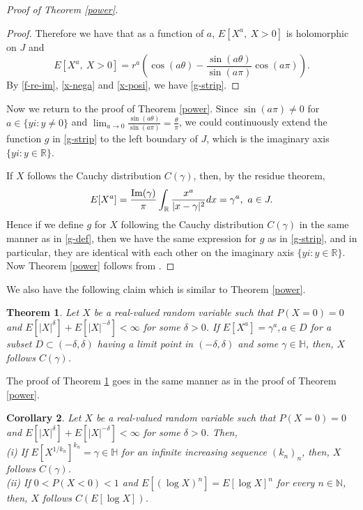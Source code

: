 \documentclass[a4paper, reqno, 11pt]{amsart}
\newtheorem{Thm}{Theorem}[section]
\newtheorem{Cor}[Thm]{Corollary}
\theoremstyle{definition}
\begin{document}
\begin{proof}[Proof of Theorem \ref{power}]
\begin{proof}
Therefore we have that as a function of $a$, 
$E\left[X^a, \ X > 0 \right]$ is holomorphic on $J$ and
\begin{equation}\label{x-posi} 
E\left[X^a, \ X > 0 \right] = r^a \left(\cos(a\theta) - \frac{\sin(a\theta)}{\sin(a\pi)}\cos(a\pi) \right). 
\end{equation}
By \eqref{f-re-im}, \eqref{x-nega} and \eqref{x-posi}, 
we have \eqref{g-strip}. 
\end{proof} 


Now we return to the proof of Theorem \ref{power}. %
Since $\sin(a\pi) \ne 0$ for $a \in \{yi : y \ne 0\}$ and $\displaystyle \lim_{a \to 0} \frac{\sin(a\theta)}{\sin(a\pi)} = \frac{\theta}{\pi}$, %
we could continuously extend the function $g$ in  \eqref{g-strip} to the left boundary of $J$, which is the imaginary axis $\{yi : y \in \mathbb{R}\}$. 

If $X$ follows the Cauchy distribution $C(\gamma)$, then, by the residue theorem, %
\[ E[X^a] = \frac{\textup{Im}(\gamma)}{\pi} \int_{\mathbb{R}}  \frac{x^a}{|x - \gamma|^2} dx = \gamma^a, \ a \in J. \]
Hence if we define $g$ for $X$ following  the Cauchy distribution $C(\gamma)$ in the same manner as in \eqref{g-def}, %
then we have the same expression for $g$ as in \eqref{g-strip}, %
and in particular, they are identical with each other on  the imaginary axis $\{yi : y \in \mathbb{R}\}$. 
Now Theorem \ref{power} follows from \cite[Theorem 1.19]{galambos2004}. 
\end{proof} 

We also have the following claim which is similar to Theorem \ref{power}. 

\begin{Thm}\label{power-2} 
Let $X$ be a real-valued random variable such that $P(X = 0) = 0$ and  $E\left[|X|^{\delta}\right] + E\left[|X|^{-\delta}\right] < \infty$  for some $\delta > 0$. 
If $E[X^a] = \gamma^a, a \in D$ for  a subset $D \subset (-\delta, \delta)$ having a limit point in $ (-\delta, \delta)$ and some $\gamma \in \mathbb{H}$, 
then, $X$ follows $C(\gamma)$. 
\end{Thm}

The proof of Theorem \ref{power-2} goes in the same manner as in the proof of Theorem \ref{power}. 

\begin{Cor}
Let $X$ be a real-valued random variable such that $P(X = 0) = 0$ and  $E\left[|X|^{\delta}\right] + E\left[|X|^{-\delta}\right] < \infty$  for some $\delta > 0$. Then, \\
(i)  If $E\left[ X^{1/k_n}\right]^{k_n} = \gamma \in \mathbb{H}$ for an infinite increasing sequence $(k_n)_n$,   
then, $X$ follows  $C(\gamma)$. \\
(ii) If $0 < P(X < 0) < 1$ and $E[(\log X)^n] = E[\log X]^n$ for every $n \in \mathbb{N}$, %
then, $X$ follows  $C(E[\log X])$. 
\end{Cor}
\end{document}
